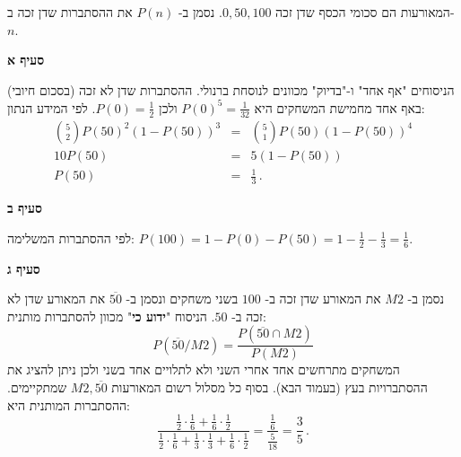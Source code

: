 המאורעות הם סכומי הכסף שדן זכה 
$0,50,100$.
נסמן ב-%
$P(n)$
את ההסתברות שדן זכה ב-%
$n$.

\textbf{סעיף א}

הניסוחים "אף אחד" ו-"בדיוק" מכוונים לנוסחת ברנולי. ההסתברות שדן לא זכה (בסכום חיובי) באף אחד מחמישת המשחקים היא 
$P(0)^5=\frac{1}{32}$
ולכן 
$P(0)=\frac{1}{2}$.
לפי המידע הנתון:
\begin{eqnarray*}
{5\choose 2} P(50)^2 (1-P(50))^3 &=& {5\choose 1} P(50) (1-P(50))^4\\
10P(50)&=&5(1-P(50))\\
P(50)&=&\frac{1}{3}\,.
\end{eqnarray*}

\textbf{סעיף ב}

לפי ההסתברות המשלימה:
$P(100) = 1 - P(0) - P(50) = 1-\frac{1}{2}-\frac{1}{3}=\frac{1}{6}$.



\textbf{סעיף ג}

נסמן ב-%
$M2$
את המאורע שדן זכה ב-%
$100$
בשני משחקים ונסמן ב-%
$\overline{50}$
את המאורע שדן לא זכה ב-%
$50$.
הניסוח
"\textbf{ידוע כי}"
מכוון להסתברות מותנית:
\[
P(\overline{50}/M2)=\frac{P(\overline{50}\cap M2)}{P(M2)}
\]
המשחקים מתרחשים אחד אחרי השני ולא לתלויים אחד בשני ולכן ניתן להציג את ההסתברויות בעץ (בעמוד הבא). בסוף כל מסלול רשום המאורעות 
$M2,\overline{50}$
שמתקיימים. ההסתברות המותנית היא:
\[
\frac{\frac{1}{2}\cdot\frac{1}{6} + \frac{1}{6}\cdot \frac{1}{2}}{\frac{1}{2}\cdot\frac{1}{6} + \frac{1}{3}\cdot \frac{1}{3}+ \frac{1}{6}\cdot \frac{1}{2}}  =  \frac{\frac{1}{6}}{\frac{5}{18}}=\frac{3}{5}\,.
\]

